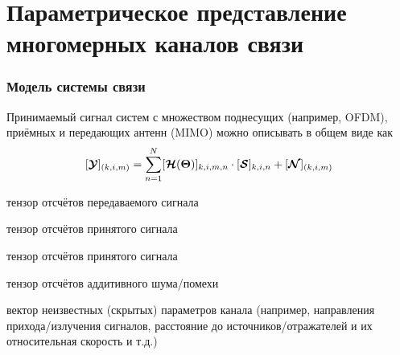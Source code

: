 \section{Параметрическое представление многомерных каналов связи}

\begin{frame}
	\frametitle{Модель системы связи}
	
	Принимаемый сигнал систем с множеством поднесущих (например, OFDM), приёмных и передающих антенн (MIMO) можно описывать в общем виде как
	\begin{equation}
	\label{eq:1}
	[\boldsymbol{\mathcal Y}]_{(k,i,{m})} = \sum_{{n}=1}^{{N}} [\boldsymbol{\mathcal H}({\boldsymbol{\Theta}})]_{k,i,{m},{n}} \cdot [\boldsymbol{\mathcal S}]_{k,i,{n}} + [\boldsymbol{\mathcal N}]_{(k,i,{m})}
	\end{equation}
	
	\begin{description}
		\item[$\ten{S}\in\compl^{\Nt\times \Nf \times \Ntx}$] тензор отсчётов передаваемого сигнала
		\item[$\ten{Y}\in\compl^{\Nt\times \Nf \times \Nrx}$] тензор отсчётов принятого сигнала
		\item[$\ten{H}(\pars)\in\compl^{\Nt\times \Nf \times \Nrx \times \Ntx}$] тензор отсчётов принятого сигнала
		\item[$\ten{N}\in\compl^{\Nt\times \Nf \times \Nrx}$] тензор отсчётов аддитивного шума/помехи
		\item[$\pars\in\real^\Npars$] вектор неизвестных (скрытых) параметров канала (например, направления прихода/излучения сигналов, расстояние до источников/отражателей и их относительная скорость и т.д.)
	\end{description}
		
\end{frame}

